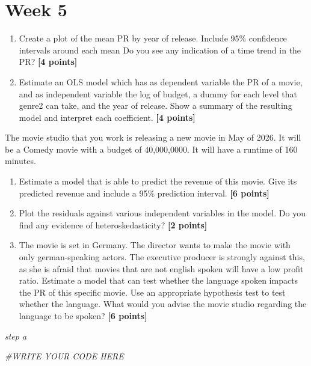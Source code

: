 \documentclass[
]{article}
\newenvironment{Shaded}{\begin{snugshade}}{\end{snugshade}}
\newcommand{\CommentTok}[1]{\textcolor[rgb]{0.56,0.35,0.01}{\textit{#1}}}
\providecommand{\tightlist}{%
  \setlength{\itemsep}{0pt}\setlength{\parskip}{0pt}}
\begin{document}
\section{Week 5}\label{week-5}

\begin{enumerate}
\def\labelenumi{\alph{enumi}.}
\tightlist
\item
  Create a plot of the mean PR by year of release. Include 95\%
  confidence intervals around each mean Do you see any indication of a
  time trend in the PR? \textbf{[4 points]}
\item
  Estimate an OLS model which has as dependent variable the PR of a
  movie, and as independent variable the log of budget, a dummy for each
  level that genre2 can take, and the year of release. Show a summary of
  the resulting model and interpret each coefficient.
  \textbf{[4 points]}
\end{enumerate}

The movie studio that you work is releasing a new movie in May of 2026.
It will be a Comedy movie with a budget of 40,000,0000. It will have a
runtime of 160 minutes.

\begin{enumerate}
\def\labelenumi{\alph{enumi}.}
\setcounter{enumi}{2}
\tightlist
\item
  Estimate a model that is able to predict the revenue of this movie.
  Give its predicted revenue and include a 95\% prediction interval.
  \textbf{[6 points]}
\item
  Plot the residuals against various independent variables in the model.
  Do you find any evidence of heteroskedasticity? \textbf{[2 points]}
\item
  The movie is set in Germany. The director wants to make the movie with
  only german-speaking actors. The executive producer is strongly
  against this, as she is afraid that movies that are not english spoken
  will have a low profit ratio. Estimate a model that can test whether
  the language spoken impacts the PR of this specific movie. Use an
  appropriate hypothesis test to test whether the language. What would
  you advise the movie studio regarding the language to be spoken?
  \textbf{[6 points]}
\end{enumerate}

\emph{step a}

\begin{Shaded}
\begin{Highlighting}[]
\CommentTok{\#WRITE YOUR CODE HERE}
\end{Highlighting}
\end{Shaded}
\end{document}
